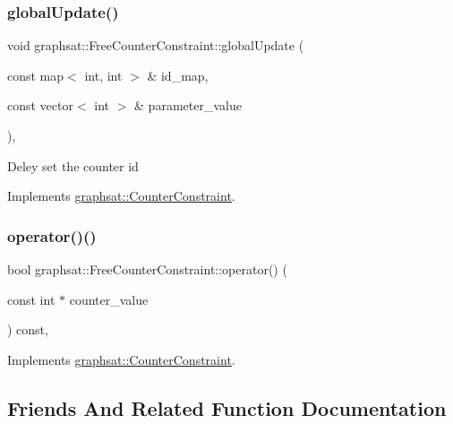 \subsubsection{\texorpdfstring{globalUpdate()}{globalUpdate()}}
{\footnotesize\ttfamily void graphsat\+::\+Free\+Counter\+Constraint\+::global\+Update (\begin{DoxyParamCaption}\item[{const map$<$ int, int $>$ \&}]{id\+\_\+map,  }\item[{const vector$<$ int $>$ \&}]{parameter\+\_\+value }\end{DoxyParamCaption})\hspace{0.3cm}{\ttfamily [inline]}, {\ttfamily [virtual]}}

Deley set the counter id 

Implements \mbox{\hyperlink{classgraphsat_1_1_counter_constraint_aa467ff66b37a1cbc69f5eddb269aaa0d}{graphsat\+::\+Counter\+Constraint}}.

\mbox{\label{classgraphsat_1_1_free_counter_constraint_a7ba59c5755c2e90b75038ca6373018bb}} 
\subsubsection{\texorpdfstring{operator()()}{operator()()}}
{\footnotesize\ttfamily bool graphsat\+::\+Free\+Counter\+Constraint\+::operator() (\begin{DoxyParamCaption}\item[{const int $\ast$}]{counter\+\_\+value }\end{DoxyParamCaption}) const\hspace{0.3cm}{\ttfamily [inline]}, {\ttfamily [virtual]}}



Implements \mbox{\hyperlink{classgraphsat_1_1_counter_constraint_a1fb82c50097b34656ef5ca319dd352da}{graphsat\+::\+Counter\+Constraint}}.



\subsection{Friends And Related Function Documentation}
\mbox{\label{classgraphsat_1_1_free_counter_constraint_ad4b3c25c041701ae56dc1e78df779d2f}} 
